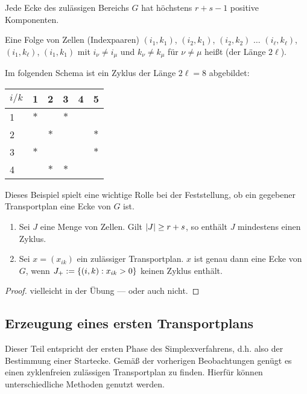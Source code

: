 \begin{folgerung} %
	Jede Ecke des zulässigen Bereichs $G$ hat höchstens $r+s-1$ positive Komponenten.
\end{folgerung}

\begin{definition} %
	Eine Folge von Zellen (Indexpaaren) $(i_1, k_1)$, $(i_2, k_1)$, $(i_2, k_2)$ $\dots$ $(i_\ell, k_\ell)$, $(i_1, k_\ell)$, $(i_1, k_1)$ mit $i_\nu \neq i_\mu$ und $k_\nu \neq k_\mu$ für $\nu \neq \mu$ heißt  (der Länge $2 \ell$).
\end{definition}

\begin{beispiel} %
	Im folgenden Schema ist ein Zyklus der Länge $2 \ell = 8$ abgebildet:
	\begin{center}
		\begin{tabular}{l|ccccc}
			$i / k$ & 1 & 2 & 3 & 4 & 5 \\ \hline
			1       & $\ast$ & & $\ast$ & & \\
			2 & & $\ast$ & & & $\ast$ \\
			3 & $\ast$ & & & & $\ast$ \\
			4 & & $\ast$ & $\ast$ & & 
		\end{tabular}
	\end{center}
	Dieses Beispiel spielt eine wichtige Rolle bei der Feststellung, ob ein gegebener Transportplan eine Ecke von $G$ ist.
\end{beispiel}

\begin{aussage} %
	\begin{enumerate}[label=(\roman*), nolistsep, topsep=-\parskip]
		\item Sei $J$ eine Menge von Zellen. Gilt $\left| J \right| \ge r+s$, so enthält $J$ mindestens einen Zyklus.
		\item Sei $x = (x_{ik})$ ein zulässiger Transportplan. $x$ ist genau dann eine Ecke von $G$, wenn $J_+ \mathrel{:=} \left\{ (i,k) : x_{ik} > 0 \right\}$ keinen Zyklus enthält.
	\end{enumerate}
\end{aussage}
\begin{proof}
	vielleicht in der Übung --- oder auch nicht.
\end{proof}

\subsection{Erzeugung eines ersten Transportplans}
Dieser Teil entspricht der ersten Phase des Simplexverfahrens, d.h. also der Bestimmung einer Startecke.
Gemäß der vorherigen Beobachtungen genügt es einen zyklenfreien zulässigen Transportplan zu finden. Hierfür können unterschiedliche Methoden genutzt werden.


